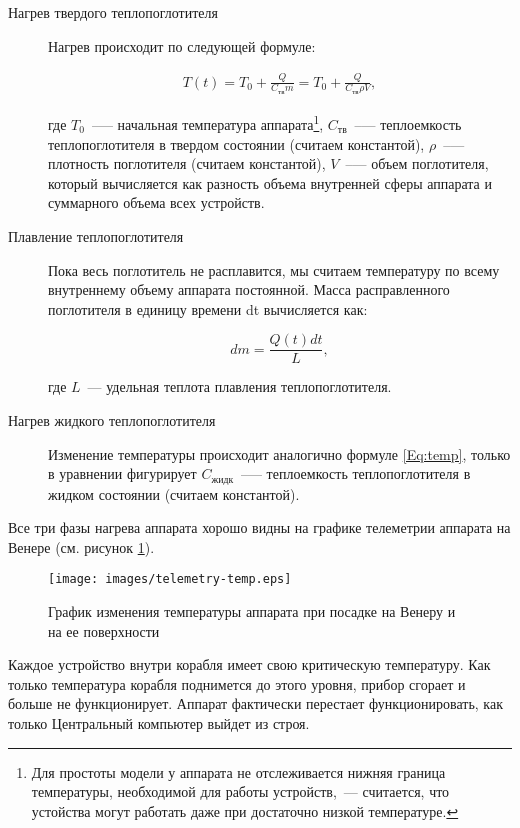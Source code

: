 \documentclass[12pt,a4paper]{article}
\begin{document}
\begin{description}

\item[Нагрев твердого теплопоглотителя] Нагрев происходит по следующей формуле:
  
\begin{eqnarray}
T(t) = T_0 + \frac{Q}{C_{\text{тв}}m} = T_0 + \frac{Q}{C_{\text{тв}}\rho V}, \label{Eq:temp}
\end{eqnarray}

где $T_0$~--— начальная температура аппарата\footnote{Для простоты модели у аппарата не
  отслеживается нижняя граница температуры, необходимой для работы устройств,~---
  считается, что устойства могут работать даже при достаточно низкой температуре.}, $C_{\text{тв}}$~--— теплоемкость
теплопоглотителя в твердом состоянии (считаем константой), $\rho$~--— плотность
поглотителя (считаем константой), $V$~--— объем поглотителя, который вычисляется как
разность объема внутренней сферы аппарата и суммарного объема всех устройств.

\item[Плавление теплопоглотителя] Пока весь поглотитель не расплавится, мы считаем
  температуру по всему внутреннему объему аппарата постоянной. Масса расправленного
  поглотителя в единицу времени dt вычисляется как:

  $$
dm = \frac{Q(t)dt}{L},
$$

где $L$~--- удельная теплота плавления теплопоглотителя.

\item[Нагрев жидкого теплопоглотителя] Изменение температуры происходит аналогично формуле
  \ref{Eq:temp}, только в уравнении фигурирует $C_{\text{жидк}}$~--— теплоемкость
  теплопоглотителя в жидком состоянии (считаем константой).

\end{description}

Все три фазы нагрева аппарата хорошо видны на графике телеметрии аппарата на Венере
(см. рисунок \ref{Pic:venus_telemetry_temp}).

\begin{figure}[tbh]
  \begin{center}
    \texttt{[image: images/telemetry-temp.eps]}
    \caption{График изменения температуры аппарата при посадке на Венеру и на ее поверхности}
    \label{Pic:venus_telemetry_temp}
  \end{center}
\end{figure}

Каждое устройство внутри корабля имеет свою критическую температуру. Как только
температура корабля поднимется до этого уровня, прибор сгорает и больше не
функционирует. Аппарат фактически перестает функционировать, как только Центральный
компьютер выйдет из строя.
\end{document}
